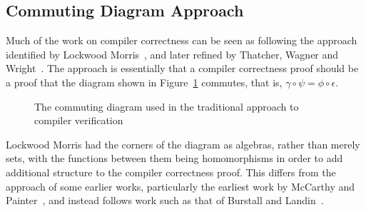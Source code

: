 \documentclass[a4paper,10pt]{article}
\begin{document}
\subsection{Commuting Diagram Approach}
\label{commuting-diagram-sec}

Much of the work on compiler correctness can be seen as following the approach
identified by Lockwood Morris~\cite{morris1973}, and later refined by Thatcher,
Wagner and Wright~\cite{thatcher1979}. The approach is essentially that a
compiler correctness proof should be a proof that the diagram shown in
Figure~\ref{commuting-diagram} commutes, that is, $\gamma \circ \psi = \phi
\circ \epsilon$.

\begin{figure}[ht]
  \begin{center}
  \end{center}
  \caption{The commuting diagram used in the traditional approach to compiler verification}
  \label{commuting-diagram}
\end{figure}

Lockwood Morris had the corners of the diagram as algebras, rather than merely
sets, with the functions between them being homomorphisms in order to add
additional structure to the compiler correctness proof.  This differs from the
approach of some earlier works, particularly the earliest work by McCarthy and
Painter~\cite{mccarthy1967}, and instead follows work such as that of Burstall
and Landin~\cite{burstall1969}.
\end{document}
